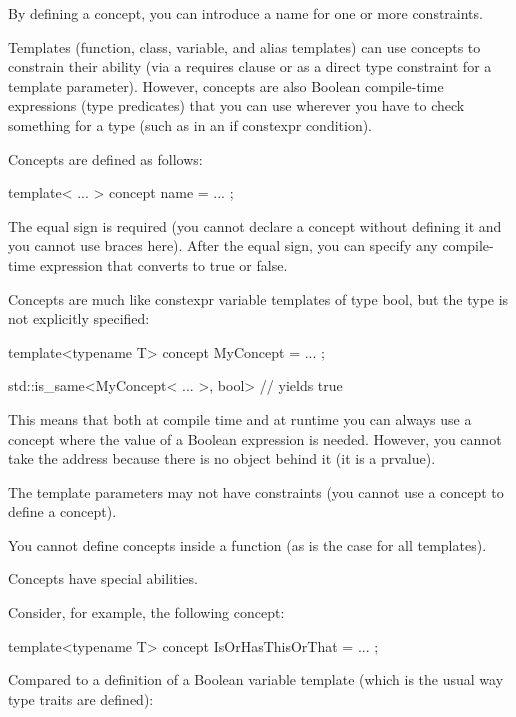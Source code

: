 
By defining a concept, you can introduce a name for one or more constraints.

Templates (function, class, variable, and alias templates) can use concepts to constrain their ability (via a requires clause or as a direct type constraint for a template parameter). However, concepts are also Boolean compile-time expressions (type predicates) that you can use wherever you have to check something for a type (such as in an if constexpr condition).


Concepts are defined as follows:

\begin{cpp}
template< ... >
concept name = ... ;
\end{cpp}

The equal sign is required (you cannot declare a concept without defining it and you cannot use braces here).
After the equal sign, you can specify any compile-time expression that converts to true or false.

Concepts are much like constexpr variable templates of type bool, but the type is not explicitly specified:

\begin{cpp}
template<typename T>
concept MyConcept = ... ;

std::is_same<MyConcept< ... >, bool> // yields true
\end{cpp}

This means that both at compile time and at runtime you can always use a concept where the value of a Boolean expression is needed. However, you cannot take the address because there is no object behind it (it is a prvalue).

The template parameters may not have constraints (you cannot use a concept to define a concept).

You cannot define concepts inside a function (as is the case for all templates).


Concepts have special abilities.

Consider, for example, the following concept:

\begin{cpp}
template<typename T>
concept IsOrHasThisOrThat = ... ;
\end{cpp}

Compared to a definition of a Boolean variable template (which is the usual way type traits are defined):

